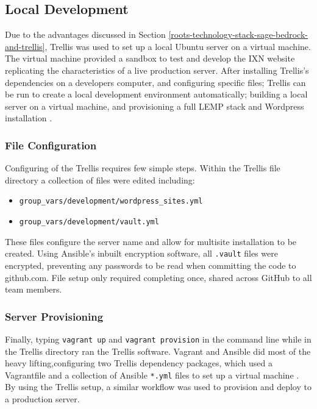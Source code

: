 \documentclass[fontsize=11pt]{extarticle}
\numberwithin{figure}{section} %
\numberwithin{table}{section}%
\providecommand{\tightlist}{%
  \setlength{\itemsep}{0pt}\setlength{\parskip}{0pt}}
\begin{document}
\hypertarget{local-development}{%
\subsection{Local Development}\label{local-development}}

Due to the advantages discussed in Section
\ref{roots-technology-stack-sage-bedrock-and-trellis}, Trellis was used
to set up a local Ubuntu server on a virtual machine. The virtual
machine provided a sandbox to test and develop the IXN website
replicating the characteristics of a live production server. After
installing Trellis's dependencies on a developers computer, and
configuring specific files; Trellis can be run to create a local
development environment automatically; building a local server on a
virtual machine, and provisioning a full LEMP stack and Wordpress
installation \cite{p21}.

\hypertarget{file-configuration}{%
\subsubsection{File Configuration}\label{file-configuration}}

Configuring of the Trellis requires few simple steps. Within the Trellis
file directory a collection of files were edited including:

\begin{itemize}
\tightlist
\item
  \texttt{group\_vars/development/wordpress\_sites.yml}
\item
  \texttt{group\_vars/development/vault.yml}
\end{itemize}

These files configure the server name and allow for multisite
installation to be created. Using Ansible's inbuilt encryption software,
all \texttt{.vault} files were encrypted, preventing any passwords to be
read when committing the code to github.com. File setup only required
completing once, shared across GitHub to all team members.

\hypertarget{server-provisioning}{%
\subsubsection{Server Provisioning}\label{server-provisioning}}

Finally, typing \texttt{vagrant\ up} and \texttt{vagrant\ provision} in
the command line while in the Trellis directory ran the Trellis
software. Vagrant and Ansible did most of the heavy lifting,configuring
two Trellis dependency packages, which used a Vagrantfile and a
collection of Ansible \texttt{*.yml} files to set up a virtual machine
\cite{p22}. By using the Trellis setup, a similar workflow was used to
provision and deploy to a production server.
\end{document}
